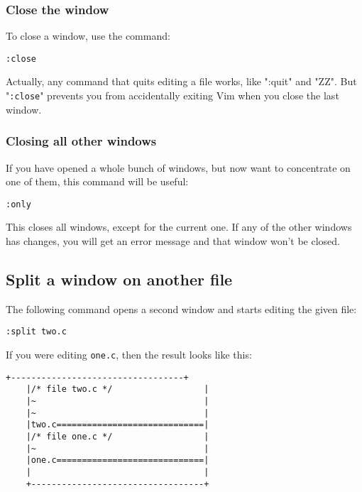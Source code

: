 \subsubsection{Close the window}
To close a window, use the command:

 \begin{Verbatim}[samepage=true]
 :close
 \end{Verbatim}

Actually, any command that quits editing a file works, like ":quit" and "ZZ".
But "\texttt{:close}" prevents you from accidentally exiting Vim when you close the last window.

\subsubsection{Closing all other windows}

If you have opened a whole bunch of windows, but now want to concentrate on one of them, this command will be useful:

 \begin{Verbatim}[samepage=true]
 :only
 \end{Verbatim}

This closes all windows, except for the current one.
If any of the other windows has changes, you will get an error message and that window won't be closed.

\subsection{Split a window on another file}
The following command opens a second window and starts editing the given file:

 \begin{Verbatim}[samepage=true]
 :split two.c
 \end{Verbatim}

If you were editing \texttt{one.c}, then the result looks like this:

\begin{Verbatim}[samepage=true]
    +----------------------------------+
    |/* file two.c */                  |
    |~                                 |
    |~                                 |
    |two.c=============================|
    |/* file one.c */                  |
    |~                                 |
    |one.c=============================|
    |                                  |
    +----------------------------------+
\end{Verbatim}

